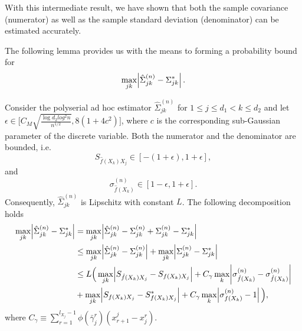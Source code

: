 With this intermediate result, we have shown that both the sample covariance (numerator) as well as the sample standard deviation (denominator) can be estimated accurately. 

The following lemma provides us with the means to forming a probability bound for 
\begin{equation*}
    \max_{jk}\abs{\hat{\Sigma}_{jk}^{(n)} -  \Sigma_{jk}^{*}}.
\end{equation*}


\begin{lemma}
    Consider the polyserial ad hoc estimator $\hat{\Sigma}_{jk}^{(n)}$ for $1 \leq j \leq d_1 < k \leq d_2$ and let $\epsilon \in \Big[ C_M\sqrt{\frac{\log d_2 log^2 n}{n^{1/2}}}, 8(1+4c^2)\Big]$, where $c$ is the corresponding sub-Gaussian parameter of the discrete variable. 
    Both the numerator and the denominator are bounded, i.e.
    \begin{equation*}
        S_{\hat{f}(X_k)X_j} \in [-(1 + \epsilon), 1 + \epsilon],
    \end{equation*}
    and 
    \begin{equation*}
        \sigma_{\hat{f}(X_k)}^{(n)} \in [1-\epsilon, 1+\epsilon].
    \end{equation*}
    Consequently, $\hat{\Sigma}_{jk}^{(n)}$ is Lipschitz with constant $L$. The following decomposition holds
    \begin{align*}
        \max_{jk}\abs{\hat{\Sigma}_{jk}^{(n)} -  \Sigma_{jk}^{*}} &=  \max_{jk}\abs{\hat{\Sigma}_{jk}^{(n)} - {\Sigma}_{jk}^{(n)} + {\Sigma}_{jk}^{(n)} - \Sigma_{jk}^{*}} \\
        &\leq \max_{jk}\abs{\hat{\Sigma}_{jk}^{(n)} - {\Sigma}_{jk}^{(n)}} + \max_{jk}\abs{{\Sigma}_{jk}^{(n)} - \Sigma_{jk}^{*}} \\
        &\leq L \Big( \max_{jk} \abs{S_{\hat{f}(X_k)X_j} - S_{{f}(X_k)X_j} } + C_\gamma \max_{k} \abs{\sigma_{\hat{f}(X_k)}^{(n)} - \sigma_{\hat{f}(X_k)}^{(n)} } \\
        &+  \max_{jk} \abs{S_{{f}(X_k)X_j} - S^*_{{f}(X_k)X_j}}  + C_\gamma \max_{k} \abs{\sigma^{(n)}_{{f}(X_k)} - 1} \Big),
    \end{align*}
    where $C_\gamma \equiv \sum_{r=1}^{l_{X_j}-1} \phi(\bar{\gamma}_j^r)(x^j_{r+1} - x_j^r)$.
\end{lemma}

